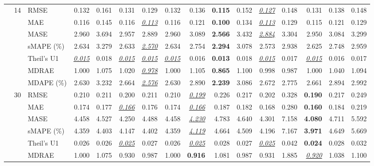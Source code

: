 \begin{table}[!htbp]
{\begin{tabular}{lllrrrrrrrrrrrrr}
\cmidrule(lr){2-16}
 & 14 & RMSE & 0.132 & 0.161 & 0.131 & 0.129 & 0.132 & 0.136 & \textbf{0.115} & 0.152 & \underline{\textit{0.127}} & 0.148 & 0.131 & 0.138 & 0.148 \\
 &  & MAE & 0.116 & 0.145 & 0.116 & \underline{\textit{0.113}} & 0.116 & 0.121 & \textbf{0.100} & 0.134 & \underline{\textit{0.113}} & 0.129 & 0.115 & 0.121 & 0.129 \\
 &  & MASE & 2.960 & 3.694 & 2.957 & 2.889 & 2.960 & 3.089 & \textbf{2.566} & 3.432 & \underline{\textit{2.884}} & 3.304 & 2.950 & 3.084 & 3.299 \\
 &  & sMAPE (\%) & 2.634 & 3.279 & 2.633 & \underline{\textit{2.570}} & 2.634 & 2.754 & \textbf{2.294} & 3.078 & 2.573 & 2.938 & 2.625 & 2.748 & 2.959 \\
 &  & Theil's U1 & \underline{\textit{0.015}} & 0.018 & \underline{\textit{0.015}} & \underline{\textit{0.015}} & \underline{\textit{0.015}} & 0.016 & \textbf{0.013} & 0.018 & \underline{\textit{0.015}} & 0.017 & \underline{\textit{0.015}} & 0.016 & 0.017 \\
 &  & MDRAE & 1.000 & 1.075 & 1.020 & \underline{\textit{0.978}} & 1.000 & 1.105 & \textbf{0.865} & 1.100 & 0.998 & 0.987 & 1.000 & 1.040 & 1.094 \\
 &  & MDAPE (\%) & 2.630 & 3.232 & 2.664 & \underline{\textit{2.576}} & 2.630 & 2.890 & \textbf{2.239} & 3.086 & 2.672 & 2.775 & 2.661 & 2.894 & 2.992 \\
\cmidrule(lr){2-16}
 & 30 & RMSE & 0.210 & 0.211 & 0.200 & 0.211 & 0.210 & \underline{\textit{0.199}} & 0.226 & 0.217 & 0.202 & 0.328 & \textbf{0.190} & 0.217 & 0.249 \\
 &  & MAE & 0.174 & 0.177 & \underline{\textit{0.166}} & 0.176 & 0.174 & \underline{\textit{0.166}} & 0.187 & 0.182 & 0.168 & 0.280 & \textbf{0.160} & 0.184 & 0.219 \\
 &  & MASE & 4.458 & 4.527 & 4.250 & 4.488 & 4.458 & \underline{\textit{4.230}} & 4.783 & 4.640 & 4.301 & 7.158 & \textbf{4.080} & 4.711 & 5.592 \\
 &  & sMAPE (\%) & 4.359 & 4.403 & 4.147 & 4.402 & 4.359 & \underline{\textit{4.119}} & 4.664 & 4.509 & 4.196 & 7.167 & \textbf{3.971} & 4.649 & 5.669 \\
 &  & Theil's U1 & 0.026 & 0.026 & \underline{\textit{0.025}} & 0.027 & 0.026 & \underline{\textit{0.025}} & 0.028 & 0.027 & \underline{\textit{0.025}} & 0.042 & \textbf{0.024} & 0.028 & 0.032 \\
 &  & MDRAE & 1.000 & 1.075 & 0.930 & 0.987 & 1.000 & \textbf{0.916} & 1.081 & 0.987 & 0.931 & 1.885 & \underline{\textit{0.920}} & 1.038 & 1.100 \\

\end{tabular}}
\end{table}
